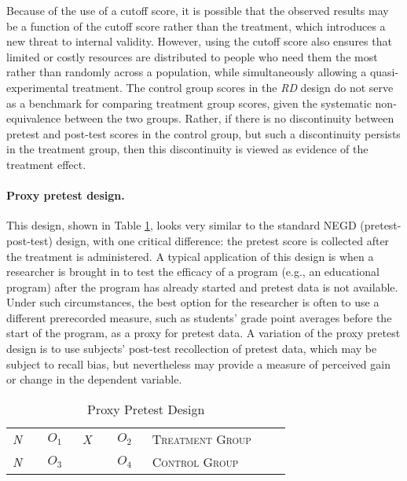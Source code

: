 Because of the use of a cutoff score, it is possible that the observed results may be a function of the cutoff score rather than the treatment, which introduces a new threat to internal validity. However, using the cutoff score also ensures that limited or costly resources are distributed to people who need them the most rather than randomly across a population, while simultaneously allowing a quasi-experimental treatment. The control group scores in the \textit{RD} design do not serve as a benchmark for comparing treatment group scores, given the systematic non-equivalence between the two groups. Rather, if there is no discontinuity between pretest and post-test scores in the control group, but such a discontinuity persists in the treatment group, then this discontinuity is viewed as evidence of the treatment effect.

\paragraph{Proxy pretest design.} This design, shown in Table \ref{09:tab11}, looks very similar to the standard NEGD (pretest-post-test) design, with one critical difference: the pretest score is collected after the treatment is administered. A typical application of this design is when a researcher is brought in to test the efficacy of a program (e.g., an educational program) after the program has already started and pretest data is not available. Under such circumstances, the best option for the researcher is often to use a different prerecorded measure, such as students' grade point averages before the start of the program, as a proxy for pretest data. A variation of the proxy pretest design is to use subjects' post-test recollection of pretest data, which may be subject to recall bias, but nevertheless may provide a measure of perceived gain or change in the dependent variable.

\begin{table}[H]
	\centering
	\begin{tabularx}{0.85\linewidth}{p{0.10\linewidth}p{0.10\linewidth}p{0.10\linewidth}p{0.10\linewidth}p{0.40\linewidth}}
		\toprule
		\textit{N} & $ O_1 $ & \textit{X} & $ O_2 $ & \textsc{Treatment Group} \\
		\textit{N} & $ O_3 $ &            & $ O_4 $ & \textsc{Control Group} \\
		\bottomrule
	\end{tabularx}
	\caption{Proxy Pretest Design}
	\label{09:tab11}
\end{table}

